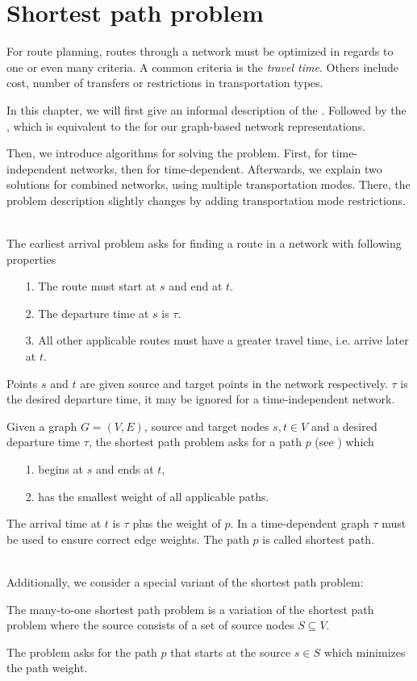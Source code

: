 \section{Shortest path problem}\label{shortestPathProblem}
	For route planning, routes through a network must be optimized in regards to one or even many criteria.
	A common criteria is the \textit{travel time}. Others include cost, number of transfers or restrictions
	in transportation types.
	
	In this chapter, we will first give an informal description of the \earliestArrivalProblem. Followed by
	the \shortestPathProblem, which is equivalent to the \earliestArrivalProblem for our graph-based network
	representations.
	
	Then, we introduce algorithms for solving the problem. First, for time-independent networks, then for time-dependent.
	Afterwards, we explain two solutions for combined networks, using multiple transportation modes. There, the problem
	description slightly changes by adding transportation mode restrictions.\\\\
	\begin{mydef}
		The earliest arrival problem asks for finding a \textnormal{route} in a network with following properties
		\begin{itemize}
			\item[1.] The route must start at $s$ and end at $t$.
			\item[2.] The departure time at $s$ is $\tau$.
			\item[3.] All other applicable routes must have a greater travel time, i.e. arrive later at $t$.
		\end{itemize}
		Points $s$ and $t$ are given source and target points in the network respectively. $\tau$ is the desired departure time,
		it may be ignored for a time-independent network.
	\end{mydef}
	\begin{mydef}
		Given a graph $G = (V, E)$, source and target nodes $s, t \in V$ and a desired departure time $\tau$, the shortest path
		problem asks for a path $p$ (see ) which
		\begin{itemize}
			\item[1.] begins at $s$ and ends at $t$,
			\item[2.] has the smallest weight of all applicable paths.
		\end{itemize}
		The arrival time at $t$ is $\tau$ plus the weight of $p$. In a time-dependent
		graph $\tau$ must be used to ensure correct edge weights. The path $p$ is called \textnormal{shortest path}.
	\end{mydef}\quad\\
	Additionally, we consider a special variant of the shortest path problem:
	\begin{mydef}
		The many-to-one shortest path problem is a variation of the shortest path problem
		where the source consists of a set of source nodes $S \subseteq V$.

		The problem asks for the path $p$ that starts at the source $s \in S$ which minimizes the path weight.
	\end{mydef}

